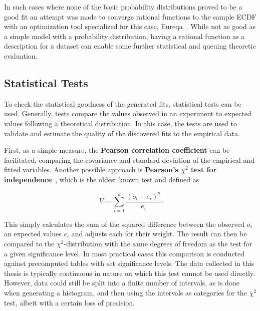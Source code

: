 In such cases where none of the basic probability distributions proved to be a good fit an attempt was made to converge rational functions to the sample \gls{ECDF} with an optimization tool specialized for this case, Eureqa~\cite{eureqa_software, eureqa_paper}. While not as good as a simple model with a probability distribution, having a rational function as a description for a dataset can enable some further statistical and queuing theoretic evaluation.


\subsection{Statistical Tests}

To check the statistical goodness of the generated fits, statistical tests can be used. Generally, tests compare the values observed in an experiment to expected values following a theoretical distribution. In this case, the tests are used to validate and estimate the quality of the discovered fits to the empirical data.

First, as a simple measure, the \textbf{Pearson correlation coefficient} can be facilitated, comparing the covariance and standard deviation of the empirical and fitted variables. Another possible approach is \textbf{Pearson's $\chi^2$ test for independence}~\cite{doi:10.1080/14786440009463897}, which is the oldest known test and defined as

\begin{equation}
	\phantom{.}V=\sum_{i=1}^{k} \frac{{(o_i - e_i)}^2}{e_i}\text{.}
\end{equation}

This simply calculates the sum of the squared difference between the observed $o_i$ an expected values $e_i$ and adjusts each for their weight. The result can then be compared to the $\chi^2$-distribution with the same degrees of freedom
as the test for a given significance level. In most practical cases this comparison is conducted against precomputed tables with set significance levels. The data collected in this thesis is typically continuous in nature on which this test cannot be used directly. However, data could still be split into a finite number of intervals, as is done when generating a histogram, and then using the intervals as categories for the $\chi^2$ test, albeit with a certain loss of precision.

